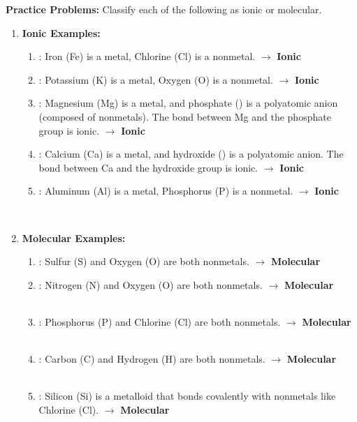 \documentclass{article}
\begin{document}
\textbf{Practice Problems:} Classify each of the following as ionic or molecular.
\begin{enumerate}[itemsep=5pt]
    \item \textbf{Ionic Examples:}
    \begin{enumerate}
        \item {}: Iron (Fe) is a metal, Chlorine (Cl) is a nonmetal. $\rightarrow$ \textbf{Ionic}
        \item {}: Potassium (K) is a metal, Oxygen (O) is a nonmetal. $\rightarrow$ \textbf{Ionic}
        \item {}: Magnesium (Mg) is a metal, and phosphate () is a polyatomic anion (composed of nonmetals). The bond between Mg and the phosphate group is ionic. $\rightarrow$ \textbf{Ionic}
        \item {}: Calcium (Ca) is a metal, and hydroxide () is a polyatomic anion. The bond between Ca and the hydroxide group is ionic. $\rightarrow$ \textbf{Ionic}
        \item {}: Aluminum (Al) is a metal, Phosphorus (P) is a nonmetal. $\rightarrow$ \textbf{Ionic}
    \end{enumerate}
    \item \textbf{Molecular Examples:}
    \begin{enumerate}
        \item {}: Sulfur (S) and Oxygen (O) are both nonmetals. $\rightarrow$ \textbf{Molecular}
        \item {}: Nitrogen (N) and Oxygen (O) are both nonmetals. $\rightarrow$ \textbf{Molecular}
        \item {}: Phosphorus (P) and Chlorine (Cl) are both nonmetals. $\rightarrow$ \textbf{Molecular}
        \item {}: Carbon (C) and Hydrogen (H) are both nonmetals. $\rightarrow$ \textbf{Molecular}
        \item {}: Silicon (Si) is a metalloid that bonds covalently with nonmetals like Chlorine (Cl). $\rightarrow$ \textbf{Molecular}
    \end{enumerate}
\end{enumerate}

\bigskip
\end{document}
